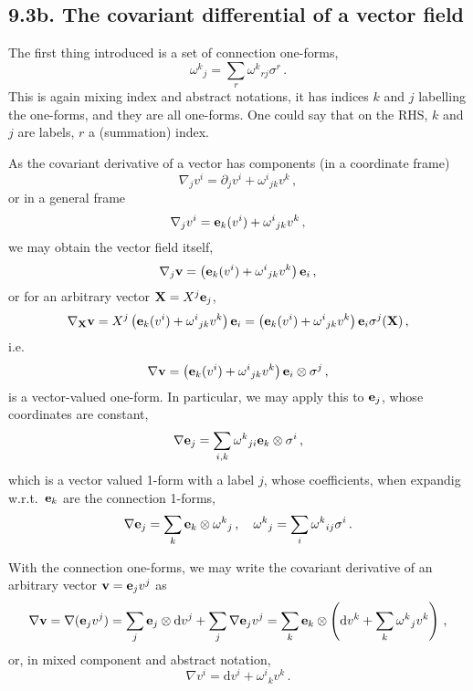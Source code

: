 \documentclass[a4paper,12pt]{article}
\def\d{\mathrm{d}}
\begin{document}
\subsection*{9.3b. The covariant differential of a vector field}

The first thing introduced is a set of connection one-forms,
\[
 \omega^k{}_j = \sum_{r}\omega^k{}_{rj} \sigma^r\,.
\]
This is again mixing index and abstract notations, it has indices $k$ and $j$ labelling the one-forms, and they are all one-forms. One could say that on the RHS, 
$k$ and $j$ are labels, $r$ a (summation) index.

As the covariant derivative of a vector has components (in a coordinate frame)
\[
 \nabla_j v^i = \partial_j v^i + \omega^i{}_{jk}v^k\,,
\]
or in a general frame
\[
 \nabla_j v^i = {\bf e}_k (v^i) + \omega^i{}_{jk}v^k\,,
\]
we may obtain the vector field itself,
\[
 \nabla_j {\bf v} = \left({\bf e}_k (v^i) + \omega^i{}_{jk}v^k\right) {\bf e}_i\,,
\]
or for an arbitrary vector ${\bf X}=X^j {\bf e}_j$,
\[
 \nabla_{\bf X}{\bf v} = X^j\left({\bf e}_k (v^i) + \omega^i{}_{jk}v^k\right) {\bf e}_i = \left({\bf e}_k (v^i) + \omega^i{}_{jk}v^k\right) {\bf e}_i \sigma^j({\bf X})\,,
\]
i.e.
\[
\nabla {\bf v} = \left({\bf e}_k (v^i) + \omega^i{}_{jk}v^k\right) {\bf e}_i \otimes \sigma^j\,,
\]
is a vector-valued one-form. In particular, we may apply this to ${\bf e}_j$, whose coordinates are constant,
\[
 \nabla {\bf e}_j = \sum_{i, k}\omega^k{}_{ji} {\bf e}_k \otimes \sigma^i\,,
\]
which is a vector valued 1-form with a label $j$, whose coefficients, when expandig w.r.t.\ ${\bf e}_k$ are the connection 1-forms,
\[
 \nabla{\bf e}_j = \sum_k {\bf e}_k \otimes \omega^k{}_j\,,\quad \omega^k{}_j = \sum_i \omega^k{}_{ij}\sigma^i\,.
\]

With the connection one-forms, we may write the covariant derivative of an arbitrary vector ${\bf v} = {\bf e}_j v^j$ as
\[
 \nabla {\bf v} = \nabla ({\bf e}_j v^j) = \sum_j{\bf e}_j\otimes \d v^j  + \sum_j \nabla {\bf e}_j v^j = \sum_k{\bf e}_k \otimes \left(\d v^k + \sum_k \omega^k{}_j v^k\right)\,,
\]
or, in mixed component and abstract notation,
\[
 \nabla v^i = \d v^i + \omega^i{}_k v^k\,.
\]
\end{document}
